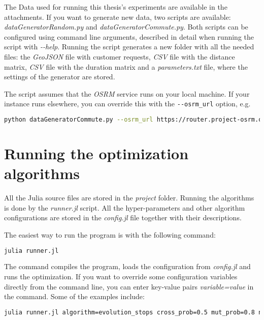 The Data used for running this thesis's experiments are available in the attachments. If you want to generate new data, two scripts are available: \textit{dataGeneratorRandom.py} and \textit{dataGeneratorCommute.py}. Both scripts can be configured using command line arguments, described in detail when running the script with \textit{-{}-help}. Running the script generates a new folder with all the needed files: the \textit{GeoJSON} file with customer requests, \textit{CSV} file with the distance matrix, \textit{CSV} file with the duration matrix and a \textit{parameters.txt} file, where the settings of the generator are stored.

The script assumes that the \textit{OSRM} service runs on your local machine. If your instance runs elsewhere, you can override this with the \texttt{-{}-osrm\_url} option, e.g.

\begin{lstlisting}[language=bash, breaklines=true]
    python dataGeneratorCommute.py --osrm_url https://router.project-osrm.org
\end{lstlisting}

\section{Running the optimization algorithms}

All the Julia source files are stored in the \textit{project} folder. Running the algorithms is done by the \textit{runner.jl} script. All the hyper-parameters and other algorithm configurations are stored in the \textit{config.jl} file together with their descriptions.

The easiest way to run the program is with the following command:
\begin{lstlisting}[language=bash]
    julia runner.jl
\end{lstlisting}

The command compiles the program, loads the configuration from \textit{config.jl} and runs the optimization. If you want to override some configuration variables directly from the command line, you can enter key-value pairs \textit{variable=value} in the command. Some of the examples include:

\begin{lstlisting}[language=bash, breaklines=true]
    julia runner.jl algorithm=evolution_stops cross_prob=0.5 mut_prob=0.8 num_generations=20000
\end{lstlisting}

